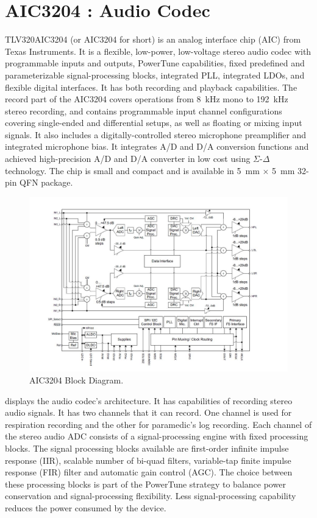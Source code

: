 \section{AIC3204 : Audio Codec}

TLV320AIC3204 (or AIC3204 for short) is an analog interface chip
(AIC) from Texas Instruments.  It is a flexible, low-power,
low-voltage stereo audio codec with programmable inputs and outputs,
PowerTune capabilities, fixed predefined and parameterizable
signal-processing blocks, integrated PLL, integrated LDOs, and
flexible digital interfaces. It has both recording and playback
capabilities. The record part of the AIC3204 covers operations from
8~kHz mono to 192~kHz stereo recording, and contains programmable
input channel configurations covering single-ended and differential
setups, as well as floating or mixing input signals. It also includes
a digitally-controlled stereo microphone preamplifier and integrated
microphone bias. It integrates A/D and D/A conversion functions and
achieved high-precision A/D and D/A converter in low cost using
$\Sigma$-$\Delta$ technology. The chip is small and compact and is
available in 5~mm $\times$ 5~mm 32-pin QFN package. 

\begin{figure}
	\centering
	\includegraphics[scale = 0.7 ]{AIC3204}
\caption{AIC3204 Block Diagram. \cite{audiocodec}}
\label{aic3204}
\end{figure}

 displays the audio codec's architecture. It has
capabilities of recording stereo audio signals. It has two channels
that it can record. One channel is used for respiration recording and
the other for paramedic's log recording. Each channel of the stereo
audio ADC consists of a signal-processing engine with fixed
processing blocks. The signal processing blocks available are
first-order infinite impulse response (IIR), scalable number of
bi-quad filters, variable-tap finite impulse response (FIR) filter
and automatic gain control (AGC). The choice between these processing
blocks is part of the PowerTune strategy to balance power
conservation and signal-processing flexibility. Less
signal-processing capability reduces the power consumed by the
device.


